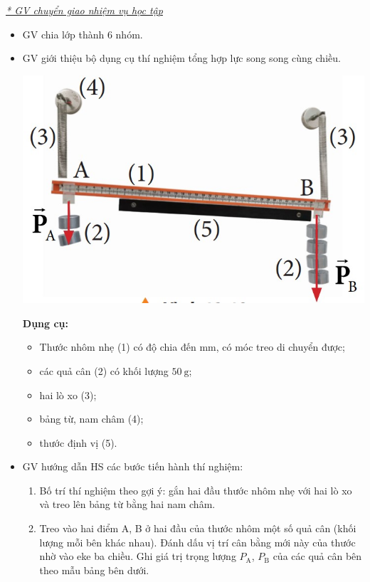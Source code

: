 {\textit{\underline{* GV chuyển giao nhiệm vụ học tập}}\\
	\begin{itemize}[label=-]
		\item GV chia lớp thành 6 nhóm.
		\item GV giới thiệu bộ dụng cụ thí nghiệm tổng hợp lực song song cùng chiều.
		\begin{center}
			\includegraphics[scale=0.7]{figs/G10-BAI9-10}
		\end{center}
		\textbf{Dụng cụ:}\\
		\begin{itemize}[label=$\bullet$]
			\item Thước nhôm nhẹ (1) có độ chia đến $\si{\milli\meter}$, có móc treo di chuyển được;
			\item các quả cân (2) có khối lượng $\SI{50}{\gram}$;
			\item hai lò xo (3);
			\item bảng từ, nam châm (4);
			\item thước định vị (5).
		\end{itemize}
		\item GV hướng dẫn HS các bước tiến hành thí nghiệm:
		\begin{enumerate}[label=\bfseries $\bullet$ Bước \arabic*:, leftmargin=2cm]
			\item Bố trí thí nghiệm theo gợi ý: gắn hai đầu thước nhôm nhẹ với hai lò xo và treo lên bảng từ bằng hai nam châm.
			\item Treo vào hai điểm A, B ở hai đầu của thước nhôm một số quả cân (khối lượng mỗi bên khác nhau). Đánh dấu vị trí cân bằng mới này của thước nhờ vào eke ba chiều. Ghi giá trị trọng lượng $P_{\mathrm{A}}$, $P_{\mathrm{B}}$ của các quả cân bên theo mẫu bảng bên dưới.

\end{enumerate}
\end{itemize}}
